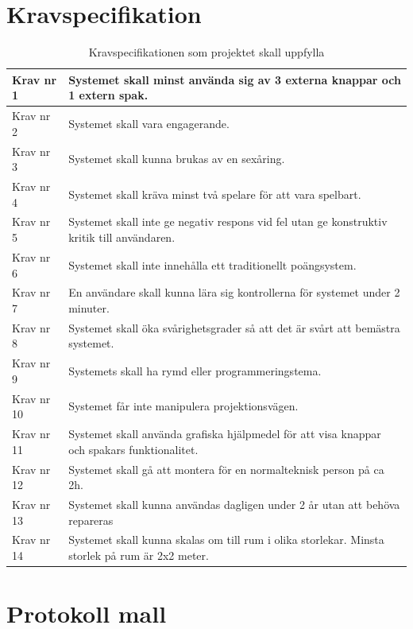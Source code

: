 \documentclass[a4paper,12pt,oneside,final]{extbook}
\begin{document}
\chapter{Kravspecifikation}\label{Kravspecifikation}
\begin{table}[H]
	\centering
	
	\begin{tabular}{ | m{5em} | m{30em}| } 
		\hline
		Krav nr 1& Systemet skall minst använda sig av 3 externa knappar och 1 extern spak.   \\ 
		\hline
		Krav nr 2 & Systemet skall vara engagerande.  \\ 
		\hline
		Krav nr 3 & Systemet skall kunna brukas av en sexåring. \\ 
		\hline
		Krav nr 4& Systemet skall kräva minst två spelare för att vara spelbart. \\ 
		\hline
		Krav nr 5 & Systemet skall inte ge negativ respons vid fel utan ge konstruktiv kritik till användaren. \\ 
		\hline
		Krav nr 6 & Systemet skall inte innehålla ett traditionellt poängsystem. \\ 
		\hline
		Krav nr 7& En användare skall kunna lära sig kontrollerna för systemet under 2 minuter. \\ 
		\hline
		Krav nr 8 & Systemet skall öka svårighetsgrader så att det är svårt att bemästra systemet. \\ 
		\hline
		Krav nr 9 & Systemets skall ha rymd eller programmeringstema. \\ 
		\hline
		Krav nr 10& Systemet får inte manipulera projektionsvägen. \\ 
		\hline
		Krav nr 11& Systemet skall använda grafiska hjälpmedel för att visa knappar och spakars funktionalitet.  \\ 
		\hline
		Krav nr 12& Systemet skall gå att montera för en normalteknisk person på ca 2h. \\ 
		\hline
		Krav nr 13& Systemet skall kunna användas dagligen under 2 år utan att behöva repareras \\ 
		\hline
		Krav nr 14 & Systemet skall kunna skalas om till rum i olika storlekar. Minsta storlek på rum är 2x2 meter. \\ 
		\hline
	\end{tabular}
	\caption{Kravspecifikationen som projektet skall uppfylla}

\end{table}


\chapter{Protokoll mall}\label{protokoll}
\end{document}
